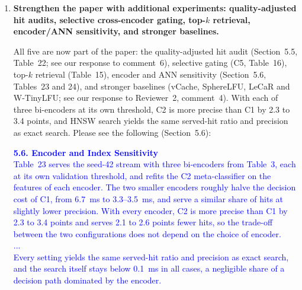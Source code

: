 \documentclass[11pt]{article}
\begin{document}
\begin{enumerate}[leftmargin=*, itemsep=1.2em]
\textcolor{blue}{\textbf{5.7. Eviction Policy Evaluation}\\
...\\
To see why semantic retention gains little, Table~27 records the cache contents at every eviction at capacity 400: the number of live entries within the hit radius of the victim, the share of victims whose topic is still covered by another live entry, and the share of victims that were never hit. Redundancy is low under every policy: a victim has on average 0.035--0.056 neighbors within the hit radius, and its topic remains covered in only 1.4--2.2\% of evictions. Between 82\% and 100\% of victims were never hit, so the decision that matters is which of many unrepeated entries to keep, and a score that ranks entries by their proximity to popular requests finds few near-duplicates to separate.}

\item \textbf{Strengthen the paper with additional experiments: quality-adjusted hit audits, selective cross-encoder gating, top-$k$ retrieval, encoder/ANN sensitivity, and stronger baselines.}

All five are now part of the paper: the quality-adjusted hit audit (Section~5.5, Table~22; see our response to comment~6), selective gating (C5, Table~16), top-$k$ retrieval (Table~15), encoder and ANN sensitivity (Section~5.6, Tables~23 and 24), and stronger baselines (vCache, SphereLFU, LeCaR and W-TinyLFU; see our response to Reviewer~2, comment~4). With each of three bi-encoders at its own threshold, C2 is more precise than C1 by 2.3 to 3.4 points, and HNSW search yields the same served-hit ratio and precision as exact search. Please see the following (Section~5.6):

\textcolor{blue}{\textbf{5.6. Encoder and Index Sensitivity}\\
Table~23 serves the seed-42 stream with three bi-encoders from Table~3, each at its own validation threshold, and refits the C2 meta-classifier on the features of each encoder. The two smaller encoders roughly halve the decision cost of C1, from 6.7~ms to 3.3--3.5~ms, and serve a similar share of hits at slightly lower precision. With every encoder, C2 is more precise than C1 by 2.3 to 3.4 points and serves 2.1 to 2.6 points fewer hits, so the trade-off between the two configurations does not depend on the choice of encoder.\\
...\\
Every setting yields the same served-hit ratio and precision as exact search, and the search itself stays below 0.1~ms in all cases, a negligible share of a decision path dominated by the encoder.}


\end{enumerate}
\end{document}
